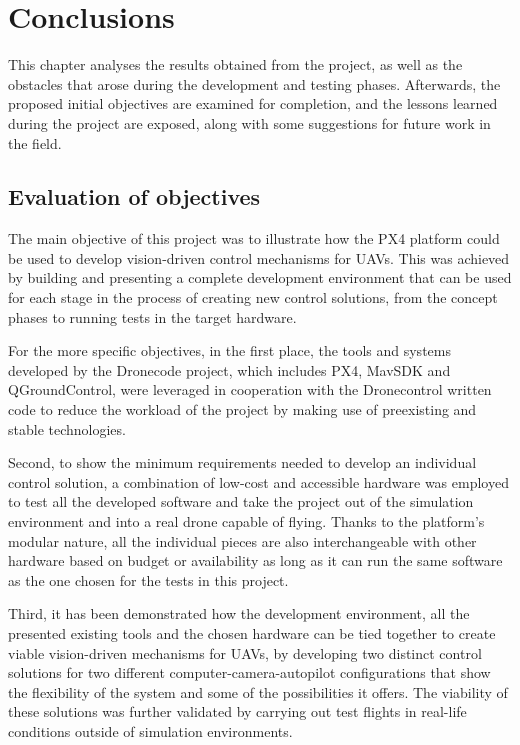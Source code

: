 \chapter{Conclusions}
\label{chap:conclusion}

This chapter analyses the results obtained from the project, as well as the obstacles that arose during the development and testing phases.
Afterwards, the proposed initial objectives are examined for completion, and the lessons learned during the project are exposed, along with some suggestions for future work in the field.

\section{Evaluation of objectives}
\label{sec:consecucion-objetivos}

The main objective of this project was to illustrate how the PX4 platform could be used to develop vision-driven control mechanisms for UAVs.
This was achieved by building and presenting a complete development environment that can be used for each stage in the process of creating new control solutions, from the concept phases to running tests in the target hardware.

For the more specific objectives, in the first place,
the tools and systems developed by the Dronecode project, which includes PX4, MavSDK and QGroundControl, were leveraged in cooperation with the Dronecontrol written code to reduce the workload of the project by making use of preexisting and stable technologies.

Second, to show the minimum requirements needed to develop an individual control solution, a combination of low-cost and accessible hardware was employed to test all the developed software and take the project out of the simulation environment and into a real drone capable of flying.
Thanks to the platform's modular nature, all the individual pieces are also interchangeable with other hardware based on budget or availability as long as it can run the same software as the one chosen for the tests in this project.

Third, it has been demonstrated how the development environment, all the presented existing tools and the chosen hardware can be tied together to create viable vision-driven mechanisms for UAVs, 
by developing two distinct control solutions for two different computer-camera-autopilot configurations that show the flexibility of the system and some of the possibilities it offers.
The viability of these solutions was further validated by carrying out test flights in real-life conditions outside of simulation environments.

